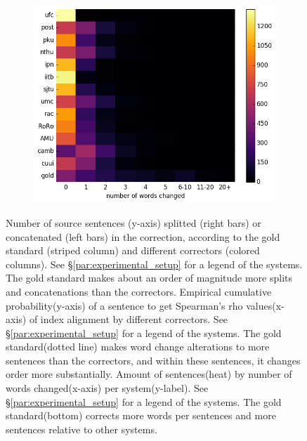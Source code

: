 \documentclass[letter,11pt]{article}
\begin{document}
\begin{figure}[tbp]
\begin{subfigure}[]{0.4\textwidth}
      \includegraphics[width = \textwidth]{words_differences_heat}
      \label{fig:words_changed}
  \end{subfigure}
  \caption{\label{fig:} Number of source sentences (y-axis) splitted (right bars) or concatenated (left bars) in the correction,
      according to
      the gold standard (striped column) and different correctors (colored columns). See \S\ref{par:experimental_setup} for a legend of the systems. The gold standard makes about an order of magnitude more splits and
      concatenations than the correctors.
      Empirical cumulative probability(y-axis) of a sentence to get Spearman's rho values(x-axis) of index alignment by different correctors. See \S\ref{par:experimental_setup} for a legend
		of the systems.
          The gold standard(dotted line) makes word change alterations to more sentences than the correctors,
          and within these sentences, it changes order more substantially.
  Amount of sentences(heat) by number of words 
        	changed(x-axis) per system(y-label). See \S\ref{par:experimental_setup} for a legend
        	of the systems. The gold standard(bottom) corrects more words per sentences and more sentences relative to other systems.}
  
  
\end{figure}
\end{document}
